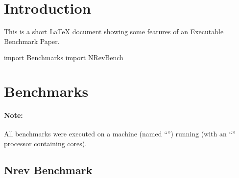 \documentclass{article}
\begin{document}
\sloppy

\section{Introduction}

This is a short LaTeX document showing some features of an
Executable Benchmark Paper.

\begin{curryprog}
import Benchmarks
import NRevBench
\end{curryprog}

\section{Benchmarks}

\paragraph{Note:}
%
All benchmarks were executed on a  machine
(named ``'')
running  
(with an ``'' processor containing
 cores).

\subsection{Nrev Benchmark}

\begin{center}
\end{center}
\end{document}
